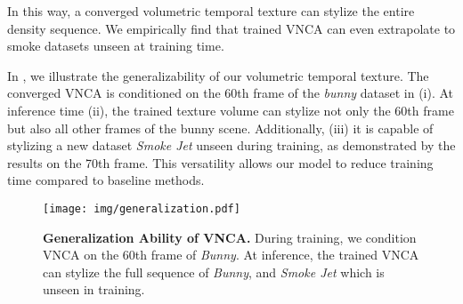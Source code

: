 In this way, a converged volumetric temporal texture can stylize the entire density sequence. We empirically find that trained VNCA can even extrapolate to smoke datasets unseen at training time. 

In , we illustrate the generalizability of our volumetric temporal texture. The converged VNCA is conditioned on the 60th frame of the \textit{bunny} dataset in (i). 
At inference time (ii), the trained texture volume can stylize not only the 60th frame but also all other frames of the bunny scene.
Additionally, (iii) it is capable of stylizing a new dataset \textit{Smoke Jet} unseen during training, as demonstrated by the results on the 70th frame. 
This versatility allows our model to reduce training time compared to baseline methods.





\begin{figure}
  \centering
  \texttt{[image: img/generalization.pdf]}
  \caption{\textbf{Generalization Ability of VNCA. } During training, we condition VNCA on the 60th frame of \textit{Bunny}. At inference, the trained VNCA can stylize the full sequence of \textit{Bunny}, and \textit{Smoke Jet} which is unseen in training.  }
  \label{fig:gen}
\end{figure}



